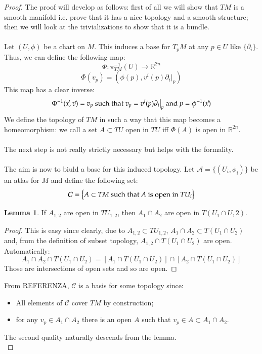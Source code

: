 \documentclass[12pt,a4paper]{report}
\theoremstyle{definition}
\theoremstyle{Theorem}
\newtheorem{Lm}[Def]{Lemma}
\theoremstyle{break}
\theoremstyle{definition}
\begin{document}
			\begin{proof}
				The proof will develop as follows: first of all we will show that $TM$ is a smooth manifold i.e. prove that it has a nice topology and a smooth structure; then we will look at the trivializations to show that it is a bundle.\\
				\\
				Let $(U,\phi)$ be a chart on $M$. This induces a base for $T_pM$ at any $p\in U$ like $\{\partial_i\}$. Thus, we can define the following map:
				$$\Phi:\pi_{TM}^{-1}(U)\rightarrow \mathbb{R}^{2n}$$
				$$\Phi(v_p)=(\phi(p),v^i(p)\partial_i\big|_p)$$
				This map has a clear inverse:
				$$\Phi^{-1}(\vec{x},\vec{v})=v_p\hbox{ such that }v_p=v^i(p)\partial_i\big|_p\hbox{ and }p=\phi^{-1}(\vec{x})$$
				We define the topology of $TM$ in such a way that this map becomes a homeomorphism: we call a set $A\subset TU$ open in $TU$ iff $\Phi(A)$ is open in $\mathbb{R}^{2n}$.\\
				\\
				The next step is not really strictly necessary but helps with the formality.\\
				\\
				The aim is now to biuld a base for this induced topology.
				Let $\mathcal{A}=\{(U_i,\phi_i)\}$ be an atlas for $M$ and define the following set:
				$$\mathcal{C}=\big\{A\subset TM\hbox{ such that }A \hbox{ is open in }TU_i\big\}$$
				\begin{Lm}
					If $A_{1,2}$ are open in $TU_{1,2}$, then $A_1\cap A_2$ are open in $T(U_1\cap U,2)$.
				\end{Lm}
				\begin{proof}
					This is easy since clearly, due to $A_{1,2}\subset TU_{1,2}$, $A_1\cap A_2\subset T(U_1\cap U_2)$ and, from the definition of subset topology, $A_{1,2}\cap T(U_1\cap U_2)$ are open. Automatically:
					$$A_1\cap A_2\cap T(U_1\cap U_2)=[A_1\cap T(U_1\cap U_2)]\cap [A_2\cap T(U_1\cap U_2)]$$
					Those are intersections of open sets and so are open.
				\end{proof}
				From REFERENZA, $\mathcal{C}$ is a basis for some topology since:
				\begin{itemize}
					\item All elements of $\mathcal{C}$ cover $TM$ by construction;
					\item for any $v_p\in A_1\cap A_2$ there is an open $A$ such that $v_p\in A\subset A_1\cap A_2$.
				\end{itemize}
				The second quality naturally descends from the lemma.\\

\end{proof}
\end{document}
